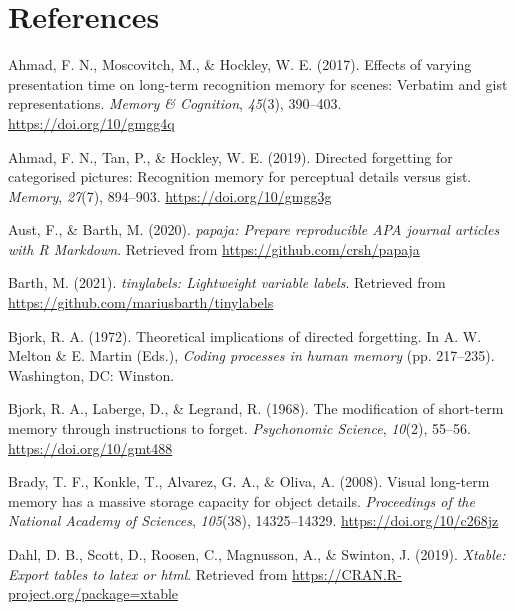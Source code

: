 \documentclass[
  english,
  man,floatsintext]{apa6}
\begin{document}
\newpage

\hypertarget{references}{%
\section{References}\label{references}}

\begingroup
\setlength{\parindent}{-0.5in}
\setlength{\leftskip}{0.5in}

\hypertarget{refs}{}
\leavevmode\hypertarget{ref-ahmadEffectsVaryingPresentation2017}{}%
Ahmad, F. N., Moscovitch, M., \& Hockley, W. E. (2017). Effects of varying presentation time on long-term recognition memory for scenes: Verbatim and gist representations. \emph{Memory \& Cognition}, \emph{45}(3), 390--403. \url{https://doi.org/10/gmgg4q}

\leavevmode\hypertarget{ref-ahmadDirectedForgettingCategorised2019}{}%
Ahmad, F. N., Tan, P., \& Hockley, W. E. (2019). Directed forgetting for categorised pictures: Recognition memory for perceptual details versus gist. \emph{Memory}, \emph{27}(7), 894--903. \url{https://doi.org/10/gmgg3g}

\leavevmode\hypertarget{ref-R-papaja}{}%
Aust, F., \& Barth, M. (2020). \emph{papaja: Prepare reproducible APA journal articles with R Markdown}. Retrieved from \url{https://github.com/crsh/papaja}

\leavevmode\hypertarget{ref-R-tinylabels}{}%
Barth, M. (2021). \emph{tinylabels: Lightweight variable labels}. Retrieved from \url{https://github.com/mariusbarth/tinylabels}

\leavevmode\hypertarget{ref-bjorkTheoreticalImplicationsDirected1972}{}%
Bjork, R. A. (1972). Theoretical implications of directed forgetting. In A. W. Melton \& E. Martin (Eds.), \emph{Coding processes in human memory} (pp. 217--235). Washington, DC: Winston.

\leavevmode\hypertarget{ref-bjorkModificationShorttermMemory1968}{}%
Bjork, R. A., Laberge, D., \& Legrand, R. (1968). The modification of short-term memory through instructions to forget. \emph{Psychonomic Science}, \emph{10}(2), 55--56. \url{https://doi.org/10/gmt488}

\leavevmode\hypertarget{ref-bradyVisualLongtermMemory2008}{}%
Brady, T. F., Konkle, T., Alvarez, G. A., \& Oliva, A. (2008). Visual long-term memory has a massive storage capacity for object details. \emph{Proceedings of the National Academy of Sciences}, \emph{105}(38), 14325--14329. \url{https://doi.org/10/c268jz}

\leavevmode\hypertarget{ref-R-xtable}{}%
Dahl, D. B., Scott, D., Roosen, C., Magnusson, A., \& Swinton, J. (2019). \emph{Xtable: Export tables to latex or html}. Retrieved from \url{https://CRAN.R-project.org/package=xtable}
\end{document}
